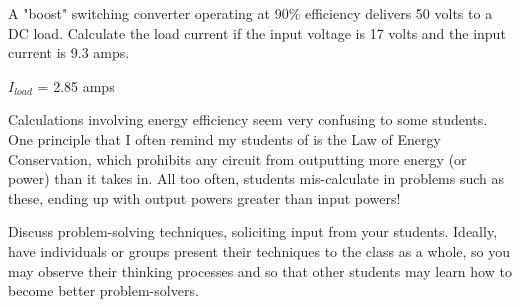 

A "boost" switching converter operating at 90\% efficiency delivers 50 volts to a DC load.  Calculate the load current if the input voltage is 17 volts and the input current is 9.3 amps.  







$I_{load}$ = 2.85 amps







Calculations involving energy efficiency seem very confusing to some students.  One principle that I often remind my students of is the Law of Energy Conservation, which prohibits any circuit from outputting more energy (or power) than it takes in.  All too often, students mis-calculate in problems such as these, ending up with output powers greater than input powers!  

Discuss problem-solving techniques, soliciting input from your students.  Ideally, have individuals or groups present their techniques to the class as a whole, so you may observe their thinking processes and so that other students may learn how to become better problem-solvers.




